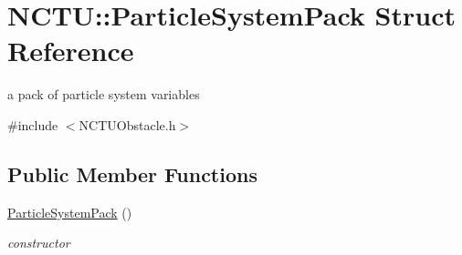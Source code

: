 \hypertarget{struct_n_c_t_u_1_1_particle_system_pack}{}\section{N\+C\+TU\+:\+:Particle\+System\+Pack Struct Reference}
\label{struct_n_c_t_u_1_1_particle_system_pack}


a pack of particle system variables  




{\ttfamily \#include $<$N\+C\+T\+U\+Obstacle.\+h$>$}

\subsection*{Public Member Functions}
\begin{DoxyCompactItemize}
\item 
\hyperlink{struct_n_c_t_u_1_1_particle_system_pack_a16f7b382e0147aec37d65597443624f5}{Particle\+System\+Pack} ()\hypertarget{struct_n_c_t_u_1_1_particle_system_pack_a16f7b382e0147aec37d65597443624f5}{}\label{struct_n_c_t_u_1_1_particle_system_pack_a16f7b382e0147aec37d65597443624f5}

\begin{DoxyCompactList}\small\item\em constructor \end{DoxyCompactList}\end{DoxyCompactItemize}
